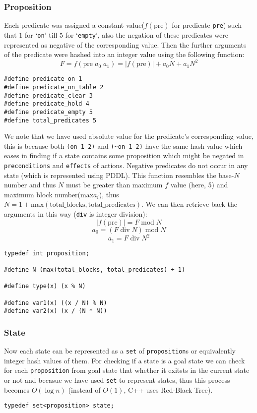 \documentclass{article}
\begin{document}
\subsubsection{Proposition}
Each predicate was assigned a constant value($f(\text{pre})$ for predicate \verb|pre|) such that $1$ for `\verb|on|' till $5$ for `\verb|empty|', also the negation of these predicates were represented as negative of the corresponding value. Then the further arguments of the predicate were hashed into an integer value using the following function:
$$F=f(\text{pre}\;a_0\;a_1) = |f(\text{pre})|+a_0N+a_1N^2$$
\begin{lstlisting}
#define	predicate_on 1
#define	predicate_on_table 2
#define	predicate_clear 3
#define	predicate_hold 4
#define	predicate_empty 5
#define total_predicates 5
\end{lstlisting}
We note that we have used absolute value for the predicate's corresponding value, this is because both \verb|(on 1 2)| and \verb|(~on 1 2)| have the same hash value which eases in finding if a state contains some proposition which might be negated in \verb|preconditions| and \verb|effects| of actions. Negative predicates do not occur in any state (which is represented using PDDL). This function resembles the base-$N$ number and thus $N$ must be greater than maximum $f$ value (here, 5) and maximum block number($\text{max}a_i$), thus $N=1+\text{max}(\text{total\_blocks},\text{total\_predicates})$. We can then retrieve back the arguments in this way (\verb|div| is integer division):
$$|f(\text{pre})|=F \;\text{mod}\;N$$
$$a_0 = (F\;\text{div}\;N)\;\text{mod}\;N$$
$$a_1 = F\;\text{div}\;N^2$$
\begin{lstlisting}
typedef int proposition;

#define N (max(total_blocks, total_predicates) + 1)

#define type(x) (x % N)

#define var1(x) ((x / N) % N)
#define var2(x) (x / (N * N))
\end{lstlisting}

\subsubsection{State}
Now each state can be represented as a \verb|set| of \verb|proposition|s or equivalently integer hash values of them. For checking if a state is a goal state we can check for each \verb|proposition| from goal state that whether it exitsts in the current state or not and becasue we have used \verb|set| to represent states, thus this process becomes $O(\log n)$ (instead of $O(1)$, C++ uses Red-Black Tree).
\begin{lstlisting}
typedef set<proposition> state;
\end{lstlisting}
\end{document}
